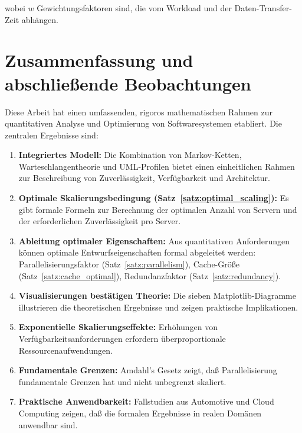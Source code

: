 \documentclass[a4paper,11pt]{article}
\theoremstyle{definition}
\begin{document}
wobei $w$ Gewichtungsfaktoren sind, die vom Workload und der Daten-Transfer-Zeit abhängen.

\section{Zusammenfassung und abschließende Beobachtungen}

Diese Arbeit hat einen umfassenden, rigoros mathematischen Rahmen zur quantitativen Analyse 
und Optimierung von Softwaresystemen etabliert. Die zentralen Ergebnisse sind:

\begin{enumerate}
    \item \textbf{Integriertes Modell:} Die Kombination von Markov-Ketten, Warteschlangentheorie 
          und UML-Profilen bietet einen einheitlichen Rahmen zur Beschreibung von 
          Zuverlässigkeit, Verfügbarkeit und Architektur.
    
    \item \textbf{Optimale Skalierungsbedingung (Satz~\ref{satz:optimal_scaling}):} 
          Es gibt formale Formeln zur Berechnung der optimalen Anzahl von Servern und der 
          erforderlichen Zuverlässigkeit pro Server.
    
    \item \textbf{Ableitung optimaler Eigenschaften:} Aus quantitativen Anforderungen können 
          optimale Entwurfseigenschaften formal abgeleitet werden: Parallelisierungsfaktor 
          (Satz~\ref{satz:parallelism}), Cache-Größe (Satz~\ref{satz:cache_optimal}), 
          Redundanzfaktor (Satz~\ref{satz:redundancy}).
    
    \item \textbf{Visualisierungen bestätigen Theorie:} Die sieben Matplotlib-Diagramme 
          illustrieren die theoretischen Ergebnisse und zeigen praktische Implikationen.
    
    \item \textbf{Exponentielle Skalierungseffekte:} Erhöhungen von Verfügbarkeitsanforderungen 
          erfordern überproportionale Ressourcenaufwendungen.
    
    \item \textbf{Fundamentale Grenzen:} Amdahl's Gesetz zeigt, daß Parallelisierung 
          fundamentale Grenzen hat und nicht unbegrenzt skaliert.
    
    \item \textbf{Praktische Anwendbarkeit:} Fallstudien aus Automotive und Cloud Computing 
          zeigen, daß die formalen Ergebnisse in realen Domänen anwendbar sind.
\end{enumerate}
\end{document}

